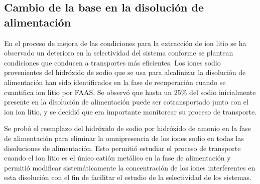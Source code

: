 \subsection{Cambio de la base en la disolución de alimentación}
En el proceso de mejora de las condiciones para la extracción de ion litio se ha observado un dete\-rioro en la selectividad del sistema conforme se plantean condiciones que conducen a transportes más eficientes. Los iones sodio provenientes del hidróxido de sodio que se usa para alcalinizar la disolución de alimentación han sido identificados en la fase de recuperación cuando se cuantifica ion litio por \ac{FAAS}. Se observó que hasta un 25\% del sodio inicialmente presente en la disolución de alimentación puede ser cotransportado junto con el ion ion litio, y se decidió que era importante monitorear su proceso de transporte. 

Se probó el reemplazo del hidróxido de sodio por hidróxido de amonio en la fase de alimentación para eliminar la omnipresencia de los iones sodio en todas las disoluciones de alimentación. Esto permitió estudiar el proceso de transporte cuando el ion litio es el único catión metálico en la fase de alimentación y permitió modificar sistemáticamente la concentración de los iones interferentes en esta disolución con el fin de facilitar el estudio de la selectividad de los sistemas. 

